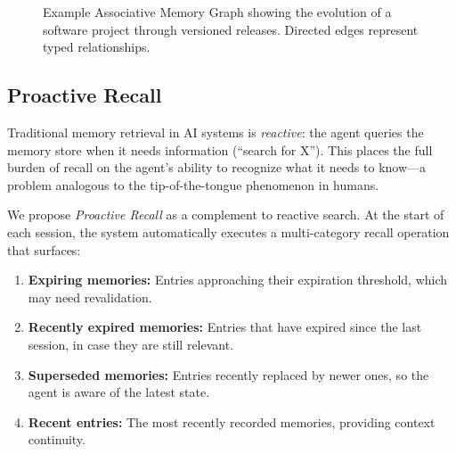 \documentclass[11pt]{article}
\begin{document}
\begin{figure}[H]
\centering
{}
\caption{Example Associative Memory Graph showing the evolution of a software project through versioned releases. Directed edges represent typed relationships.}
\label{fig:assoc-graph}
\end{figure}


\subsection{Proactive Recall}

Traditional memory retrieval in AI systems is \emph{reactive}: the agent queries the memory store when it needs information (``search for X''). This places the full burden of recall on the agent's ability to recognize what it needs to know---a problem analogous to the tip-of-the-tongue phenomenon in humans.

We propose \emph{Proactive Recall} as a complement to reactive search. At the start of each session, the system automatically executes a multi-category recall operation that surfaces:

\begin{enumerate}
    \item \textbf{Expiring memories:} Entries approaching their expiration threshold, which may need revalidation.
    \item \textbf{Recently expired memories:} Entries that have expired since the last session, in case they are still relevant.
    \item \textbf{Superseded memories:} Entries recently replaced by newer ones, so the agent is aware of the latest state.
    \item \textbf{Recent entries:} The most recently recorded memories, providing context continuity.
\end{enumerate}
\end{document}
